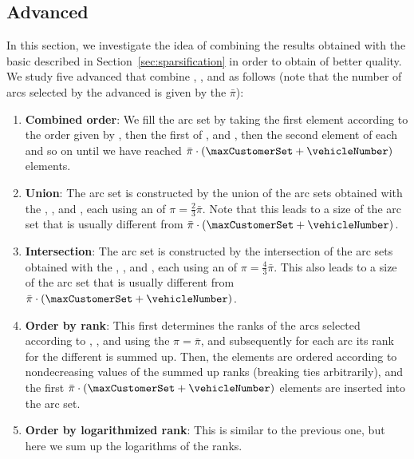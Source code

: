 \documentclass[11pt,a4paper,fleqn]{article}
\begin{document}
\subsection{Advanced \smsHeading}
\label{sec:55}
In this section, we investigate the idea of combining the results obtained with the basic \sms described in Section~\ref{sec:sparsification} in order to obtain \sms of better quality. We study five advanced \sms that combine \tacs, \nrcs, and \nrtacs as follows (note that the number of arcs selected by the advanced \sm is given by the \sfa $\bar{\pi}$):
\begin{enumerate}
\item \textbf{Combined order}: We fill the \reduced arc set by taking the first element according to the order given by \sm \tacs, then the first of \sm \nrcs, and \nrtacs, then the second element of each \standalone \sm and so on until we have reached $\bar{\pi} \cdot (\maxCustomerSet + \vehicleNumber)$ elements.
\item \textbf{Union}: The \reduced arc set is constructed by  the union of the arc sets obtained with the \sms  \tacs, \nrcs, and \nrtacs, each using an \sfa of $\pi = \frac{2}{3} \bar{\pi}$. Note that this leads to a size of the \reduced arc set that is usually different from $\bar{\pi} \cdot (\maxCustomerSet + \vehicleNumber)$.
\item \textbf{Intersection}: The \reduced arc set is constructed by the intersection of the arc sets obtained with the \sms  \tacs, \nrcs, and \nrtacs, each using an \sfa of $\pi = \frac{4}{3} \bar{\pi}$. This also leads to a size of the \reduced arc set that is usually different from $\bar{\pi} \cdot (\maxCustomerSet + \vehicleNumber)$.
\item \textbf{Order by rank}: This \sm first determines the ranks of the arcs selected according to \tacs, \nrcs, and \nrtacs  using the \sfa $\pi = \bar{\pi}$, and subsequently 
for each arc its rank for the different \sms is summed up. Then, the elements are ordered according to nondecreasing values of the summed up ranks (breaking ties arbitrarily), and the first $\bar{\pi} \cdot (\maxCustomerSet + \vehicleNumber)$ elements are inserted into the \reduced arc set. 
\item \textbf{Order by  logarithmized rank}: This \sm is similar to the previous one, but here we sum up the logarithms of the ranks.
\end{enumerate}

\end{document}
